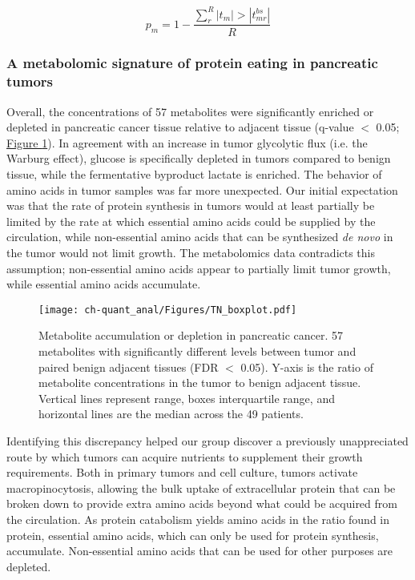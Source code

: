 \begin{equation}
p_{m} = 1 - \frac{\sum_{r}^{R}|t_{m}| > |t_{mr}^{bs}|}{R}\label{ch-quant_anal:bspval}
\end{equation}

\subsubsection{A metabolomic signature of protein eating in pancreatic tumors}

Overall, the concentrations of 57 metabolites were significantly enriched or depleted in pancreatic cancer tissue relative to adjacent tissue (q-value $<$ 0.05; \hyperref[ch-quant_anal:tnboxplot]{Figure \ref{ch-quant_anal:tnboxplot}}).  In agreement with an increase in tumor glycolytic flux (i.e. the Warburg effect), glucose is specifically depleted in tumors compared to benign tissue, while the fermentative byproduct lactate is enriched.  The behavior of amino acids in tumor samples was far more unexpected.  Our initial expectation was that the rate of protein synthesis in tumors would at least partially be limited by the rate at which essential amino acids could be supplied by the circulation, while non-essential amino acids that can be synthesized \textit{de novo} in the tumor would not limit growth. The metabolomics data contradicts this assumption; non-essential amino acids appear to partially limit tumor growth, while essential amino acids accumulate. 

\begin{figure}[h!]
\begin{center}
\texttt{[image: ch-quant\_anal/Figures/TN\_boxplot.pdf]}
\caption[Metabolite accumulation or depletion in pancreatic cancer]{Metabolite accumulation or depletion in pancreatic cancer. 57 metabolites with significantly different levels between tumor and paired benign adjacent tissues (FDR $<$ 0.05). Y-axis is the ratio of metabolite concentrations in the tumor to benign adjacent tissue. Vertical lines represent range, boxes interquartile range, and horizontal lines are the median across the 49 patients.}
\label{ch-quant_anal:tnboxplot}
\end{center}
\end{figure}

Identifying this discrepancy helped our group discover a previously unappreciated route by which tumors can acquire nutrients to supplement their growth requirements.  Both in primary tumors and cell culture, tumors activate macropinocytosis, allowing the bulk uptake of extracellular protein that can be broken down to provide extra amino acids beyond what could be acquired from the circulation. As protein catabolism yields amino acids in the ratio found in protein, essential amino acids, which can only be used for protein synthesis, accumulate. Non-essential amino acids that can be used for other purposes are depleted.


